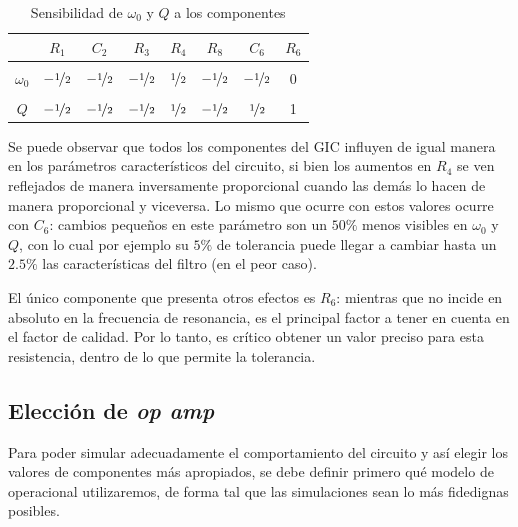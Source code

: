 \documentclass[../../tc_tp3_main.tex]{subfiles}
\begin{document}
\begin{table}[H]
	\centering
	\begin{tabular}{|c||c|c|c|c|c|c|c|}
		\hline
		\backslashbox{$y$}{$x$} & $R_1$          & $C_2$          & $R_3$          & $R_4$         & $R_8$          & $C_6$          & $R_6$ \\ \hline\hline
		\\[-1em]
		$\omega_0$                                 & $-\nicefrac{1}{2}$ & $-\nicefrac{1}{2}$ & $-\nicefrac{1}{2}$ & $\nicefrac{1}{2}$ & $-\nicefrac{1}{2}$ & $-\nicefrac{1}{2}$ & 0     \\ \hline
		\\[-1em]
		$Q$                                        & $-\nicefrac{1}{2}$ & $-\nicefrac{1}{2}$ & $-\nicefrac{1}{2}$ & $\nicefrac{1}{2}$ & $-\nicefrac{1}{2}$ & $\nicefrac{1}{2}$  & 1     \\ \hline
	\end{tabular}
	\caption{Sensibilidad de $\omega_0$ y $Q$ a los componentes}
\end{table} 

Se puede observar que todos los componentes del GIC influyen de igual manera en los par\'ametros caracter\'isticos del circuito, si bien los aumentos en $R_4$ se ven reflejados de manera inversamente proporcional cuando las dem\'as lo hacen de manera proporcional y viceversa. Lo mismo que ocurre con estos valores ocurre con $C_6$: cambios peque\~nos en este par\'ametro son un $50\%$ menos visibles en $\omega_0$ y $Q$, con lo cual por ejemplo su $5\%$ de tolerancia puede llegar a cambiar hasta un $2.5\%$ las caracter\'isticas del filtro (en el peor caso).\par 

El \'unico componente que presenta otros efectos es $R_6$: mientras que no incide en absoluto en la frecuencia de resonancia, es el principal factor a tener en cuenta en el factor de calidad. Por lo tanto, es cr\'itico obtener un valor preciso para esta resistencia, dentro de lo que permite la tolerancia.  


\subsection{Elecci\'on de \textit{op amp}}

Para poder simular adecuadamente el comportamiento del circuito y as\'i elegir los valores de componentes m\'as apropiados, se debe definir primero qu\'e modelo de operacional utilizaremos, de forma tal que las simulaciones sean lo m\'as fidedignas posibles.\par
\end{document}
